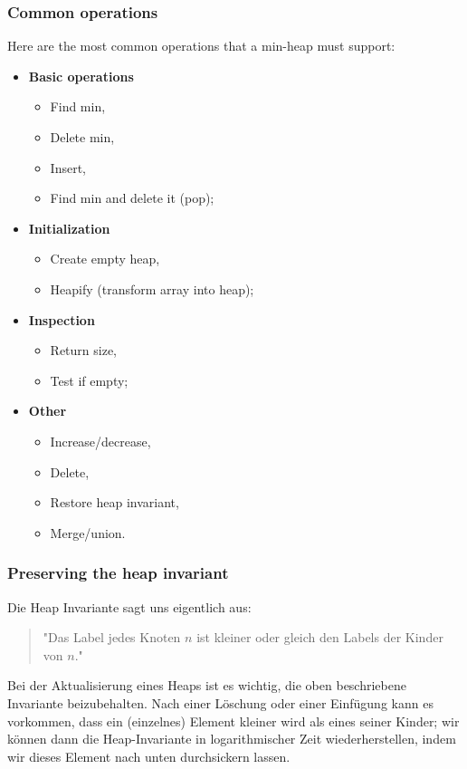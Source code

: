 \documentclass[a4paper]{article}
\begin{document}
\subsubsection*{Common operations}
Here are the most common operations that a min-heap must support:
\begin{itemize}
\item \textbf{Basic operations}
  \begin{itemize}
  \item Find min,
  \item Delete min,
  \item Insert,
  \item Find min and delete it (pop);
  \end{itemize}
\item \textbf{Initialization}
  \begin{itemize}
  \item Create empty heap,
  \item Heapify (transform array into heap);
  \end{itemize}
\item\textbf{Inspection}
  \begin{itemize}
  \item Return size,
  \item Test if empty;
  \end{itemize}
\item \textbf{Other}
  \begin{itemize}
  \item Increase/decrease,
  \item Delete,
  \item Restore heap invariant,
  \item Merge/union.
  \end{itemize}
\end{itemize}


\subsubsection*{Preserving the heap invariant}
Die Heap Invariante sagt uns eigentlich aus: 
\begin{quote}
    "Das Label jedes Knoten $n$ ist kleiner oder gleich den Labels der Kinder von $n$."
\end{quote}
Bei der Aktualisierung eines Heaps ist es wichtig, die oben beschriebene Invariante beizubehalten. Nach einer Löschung oder einer Einfügung kann es vorkommen, dass ein (einzelnes) Element kleiner wird als eines seiner Kinder; wir können dann die Heap-Invariante in logarithmischer Zeit wiederherstellen, indem wir dieses Element nach unten durchsickern lassen.
\end{document}
